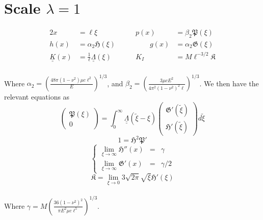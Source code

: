 \documentclass{article}
\newcommand{\fP}{\mathfrak{P}}
\newcommand{\fH}{\mathfrak{H}}
\newcommand{\fG}{\mathfrak{G}}
\newcommand{\fK}{\mathfrak{K}}
\begin{document}
\section{Scale $\lambda=1$}
%
\begin{alignat*}{2}
x &= \ell \xi  & p(x) &= \beta_2 \fP (\xi) \\
h(x) &= \alpha_2 \fH(\xi) \qquad & \qquad g(x) &= \alpha_2 \fG (\xi) \\
\underline{\underline{K}}(x) &= \frac{1}{\ell} 
\underline{\underline{\Lambda}}(\xi) & 
K_I &= M \ell^{-3/2} \fK 
\end{alignat*}
%
\\
Where $\displaystyle \alpha_2 = \left(\frac{48\pi(1-\nu^2) \mu c \ell^2}{E}
\right)^{1/3}$, and $\displaystyle \beta_2 = \left(\frac{3\mu c E^2}{4\pi^2 
(1 - \nu^2)^2 \ell}\right)^{1/3}$.
We then have the relevant equations as 
\\
\begin{equation}
 \left( \begin{array}{c} \fP(\xi) \\ 0 \end{array} \right) =
\int_0^{\infty} 
\underline{\underline{\Lambda}}(\tilde{\xi}- \xi) 
\left( \begin{array}{c} \fG'(\tilde{\xi}) \\[4pt] \fH'(\tilde{\xi}) \end{array} 
\right) d\tilde{\xi}
\end{equation}
%
\begin{equation}
1 = \fH^2 \fP'
\end{equation}
%
\begin{equation}
\left\{ \begin{array}{ccc}
\displaystyle \lim_{\xi\to\infty} \fH''(x) & = & \gamma \\
\displaystyle \lim_{\xi\to\infty} \fG'(x) & = & \gamma/2  
\end{array} \right.
\end{equation}
%
\begin{equation}
\fK = \lim_{\xi\to 0} 3 \sqrt{2\pi} \sqrt{\xi} \fH'(\xi)
\end{equation}
\\
Where $\gamma = M \left( \frac{36(1-\nu^2)^2}{\pi E^2 \mu c \ell^5} 
\right)^{1/3}$. 
\end{document}
